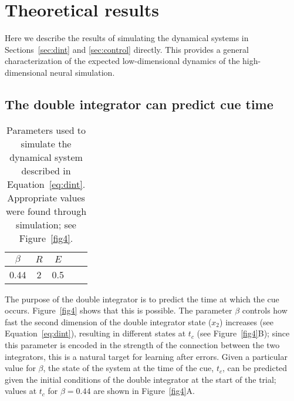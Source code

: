\documentclass[11pt]{article}
\begin{document}
\section{Theoretical results}

Here we describe the results of simulating
the dynamical systems in Sections~\ref{sec:dint}
and \ref{sec:control} directly.
This provides a general characterization
of the expected low-dimensional dynamics
of the high-dimensional neural simulation.

\subsection{The double integrator can predict cue time} \label{sec:params}

\begin{table}
  \begin{center}
    \begin{tabular}{ccccc}
      \toprule
      $\beta$ & $R$ & $E$ \\
      \midrule
      0.44 & 2 & 0.5 \\
      \bottomrule
    \end{tabular}
  \end{center}
  \caption{Parameters used to simulate the dynamical system
    described in Equation~\eqref{eq:dint}.
    Appropriate values were found through simulation;
    see Figure~\ref{fig4}.}
  \label{tab:sim-param}
\end{table}

The purpose of the double integrator
is to predict the time at which the cue occurs.
Figure~\ref{fig4} shows that this is possible.
The parameter $\beta$ controls how fast
the second dimension of the double integrator state
($x_2$) increases (see Equation~\eqref{eq:dint}),
resulting in different states at $t_c$
(see Figure~\ref{fig4}B);
since this parameter is encoded in the strength
of the connection between the two integrators,
this is a natural target for learning
after errors.
Given a particular value for $\beta$,
the state of the system at the time of the cue,
$t_c$, can be predicted given
the initial conditions of the double integrator
at the start of the trial;
values at $t_c$ for $\beta=0.44$ are shown
in Figure~\ref{fig4}A.
\end{document}
